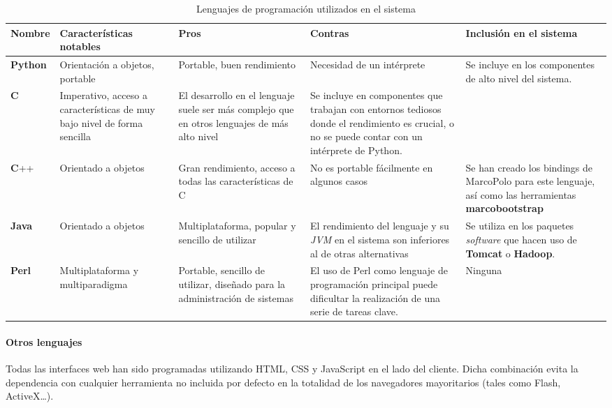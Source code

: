 \begin{landscape}
\begin{table}[H]
\begin{tabular}{|p{1.3cm}|p{4.8cm}|p{4.8cm}|p{4.8cm}|p{4.8cm}|}
\hline
Nombre & Características notables & Pros & Contras & Inclusión en el sistema\\ \hline

\textbf{Python} & Orientación a objetos, portable & Portable, buen rendimiento & Necesidad de un intérprete & Se incluye en los componentes de alto nivel del sistema.\\ \hline

\textbf{C} & Imperativo, acceso a características de muy bajo nivel de forma sencilla & El desarrollo en el lenguaje suele ser más complejo que en otros lenguajes de más alto nivel & Se incluye en componentes que trabajan con entornos tediosos donde el rendimiento es crucial, o no se puede contar con un intérprete de Python. & \\ \hline

\textbf{C}++ & Orientado a objetos & Gran rendimiento, acceso a todas las características de C & No es portable fácilmente en algunos casos & Se han creado los bindings de MarcoPolo para este lenguaje, así como las herramientas \textbf{marcobootstrap}\\ \hline

\textbf{Java} & Orientado a objetos & Multiplataforma, popular y sencillo de utilizar & El rendimiento del lenguaje y su \textit{JVM} en el sistema son inferiores al de otras alternativas & Se utiliza en los paquetes \textit{software} que hacen uso de \textbf{Tomcat} o \textbf{Hadoop}.\\ \hline
\textbf{Perl} & Multiplataforma y multiparadigma & Portable, sencillo de utilizar, diseñado para la administración de sistemas & El uso de Perl como lenguaje de programación principal puede dificultar la realización de una serie de tareas clave. & Ninguna\\ \hline
\end{tabular}
\caption{Lenguajes de programación utilizados en el sistema}
\end{table}
\end{landscape}

\paragraph{Otros lenguajes\\}

Todas las interfaces web han sido programadas utilizando HTML, CSS y JavaScript en el lado del cliente. Dicha combinación evita la dependencia con cualquier herramienta no incluida por defecto en la totalidad de los navegadores mayoritarios (tales como Flash, ActiveX\dots).


